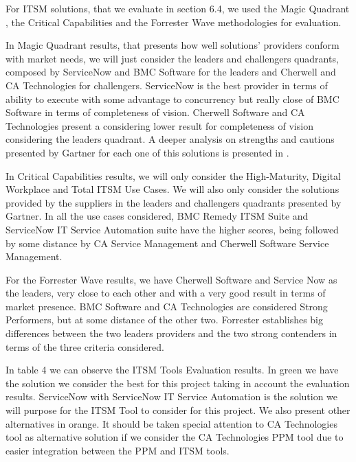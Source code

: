 For ITSM solutions, that we evaluate in section 6.4, we used the Magic Quadrant , the Critical Capabilities and the Forrester Wave methodologies for evaluation.\par
In Magic Quadrant results, that presents how well solutions' providers conform with market needs, we will just consider the leaders and challengers quadrants, composed by ServiceNow and BMC Software for the leaders and Cherwell and CA Technologies for challengers. ServiceNow is the best provider in terms of ability to execute with some advantage to concurrency but really close of BMC Software in terms of completeness of vision. Cherwell Software and CA Technologies present a considering lower result for completeness of vision considering the leaders quadrant. A deeper analysis on strengths and cautions presented by Gartner for each one of this solutions is presented in \cite{magicQuadrantITSM}.\par
In Critical Capabilities results, we will only consider the High-Maturity, Digital Workplace and Total ITSM Use Cases. We will also only consider the solutions provided by the suppliers in the leaders and challengers quadrants presented by Gartner. In all the use cases considered, BMC Remedy ITSM Suite and ServiceNow IT Service Automation suite have the higher scores, being followed by some distance by CA Service Management and Cherwell Software Service Management.\par
For the Forrester Wave results, we have Cherwell Software and Service Now as the leaders, very close to each other and with a very good result in terms of market presence. BMC Software and CA Technologies are considered Strong Performers, but at some distance of the other two. Forrester establishes big differences between the two leaders providers and the two strong contenders in terms of the three criteria considered.\par
In table 4 we can observe the ITSM Tools Evaluation results. In green we have the solution we consider the best for this project taking in account the evaluation results. ServiceNow with ServiceNow IT Service Automation is the solution we will purpose for the ITSM Tool to consider for this project. We also present other alternatives in orange. It should be taken special attention to CA Technologies tool as alternative solution if we consider the CA Technologies PPM tool due to easier integration between the PPM and ITSM tools.


